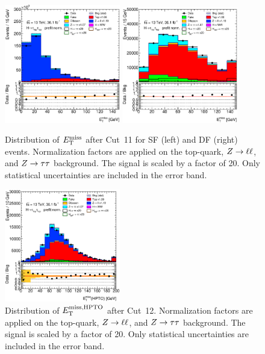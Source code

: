 \begin{figure}[htb]
    \centering
    \includegraphics[width=0.45\textwidth]{./plots/event_selection/eemm-CutJet0Pt-MET-lin.eps}
    \includegraphics[width=0.45\textwidth]{./plots/event_selection/emme-CutJet0Pt-MET-lin.eps}
    \caption{Distribution of $E_\text{T}^\text{miss}$ after Cut~11 for SF (left) and DF (right) events.
             Normalization factors are applied on the top-quark, $Z \to \ell \ell$, and $Z \to \tau \tau$ background.
             The signal is scaled by a factor of 20.
             Only statistical uncertainties are included in the error band.}\label{fig:event_selection:cutflow:met}
\end{figure}

\begin{figure}[htb]
    \centering
    \includegraphics[width=0.45\textwidth]{./plots/event_selection/eemm-CutMET-METhpto-lin.eps}
    \caption{Distribution of $E_\text{T}^\text{miss,HPTO}$ after Cut~12.
             Normalization factors are applied on the top-quark, $Z \to \ell \ell$, and $Z \to \tau \tau$ background.
             The signal is scaled by a factor of 20.
             Only statistical uncertainties are included in the error band.}\label{fig:event_selection:cutflow:hpto}
\end{figure}

